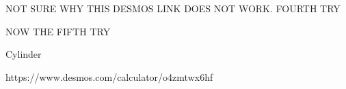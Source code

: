 \documentclass{ximera}
\begin{document}
NOT SURE WHY THIS DESMOS LINK DOES NOT WORK. FOURTH TRY

NOW THE FIFTH TRY

\begin{exploration}\label{exp:orth1}
Cylinder
\begin{center}
\end{center}
\end{exploration}


https://www.desmos.com/calculator/o4zmtwx6hf
\end{document}
